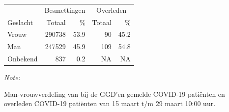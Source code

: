 \documentclass[
  english,
  man,floatsintext]{apa6}
\begin{document}
\begin{table}
\centering\begingroup\fontsize{11}{13}\selectfont

\begin{threeparttable}
\begin{tabular}{lrrrr}
\toprule
\multicolumn{1}{c}{ } & \multicolumn{2}{c}{Besmettingen} & \multicolumn{2}{c}{Overleden} \\
\cmidrule(l{3pt}r{3pt}){2-3} \cmidrule(l{3pt}r{3pt}){4-5}
Geslacht & Totaal & \% & Totaal & \%\\
\midrule
Vrouw & 290738 & 53.9 & 90 & 45.2\\
Man & 247529 & 45.9 & 109 & 54.8\\
Onbekend & 837 & 0.2 & NA & NA\\
\bottomrule
\end{tabular}
\begin{tablenotes}
\item \textit{Note: } 
\item Man-vrouwverdeling van bij de GGD’en gemelde COVID-19 patiënten en overleden COVID-19 patiënten van 15 maart t/m 29 maart 10:00 uur.
\end{tablenotes}
\end{threeparttable}
\endgroup{}
\end{table}
\newpage
\end{document}
